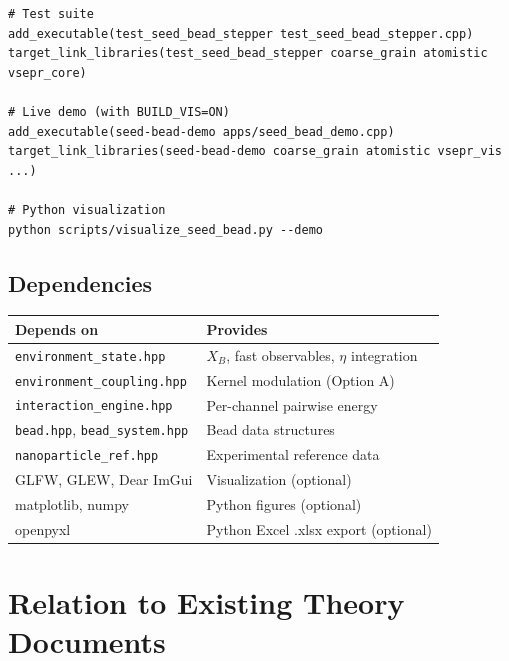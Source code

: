 \documentclass[11pt, a4paper, oneside]{article}
\newcommand{\file}[1]{\texttt{#1}}
\begin{document}
\begin{lstlisting}
# Test suite
add_executable(test_seed_bead_stepper test_seed_bead_stepper.cpp)
target_link_libraries(test_seed_bead_stepper coarse_grain atomistic vsepr_core)

# Live demo (with BUILD_VIS=ON)
add_executable(seed-bead-demo apps/seed_bead_demo.cpp)
target_link_libraries(seed-bead-demo coarse_grain atomistic vsepr_vis ...)

# Python visualization
python scripts/visualize_seed_bead.py --demo
\end{lstlisting}

\subsection{Dependencies}
\label{sec:dependencies}

\begin{center}
\begin{tabular}{ll}
  \toprule
  \textbf{Depends on} & \textbf{Provides} \\
  \midrule
  \file{environment\_state.hpp}      & $X_B$, fast observables, $\eta$ integration \\
  \file{environment\_coupling.hpp}   & Kernel modulation (Option A) \\
  \file{interaction\_engine.hpp}     & Per-channel pairwise energy \\
  \file{bead.hpp}, \file{bead\_system.hpp} & Bead data structures \\
  \file{nanoparticle\_ref.hpp}       & Experimental reference data \\
  GLFW, GLEW, Dear ImGui            & Visualization (optional) \\
  matplotlib, numpy                  & Python figures (optional) \\
  openpyxl                           & Python Excel .xlsx export (optional) \\
  \bottomrule
\end{tabular}
\end{center}

\newpage
\section{Relation to Existing Theory Documents}
\label{sec:related-documents}
\end{document}
